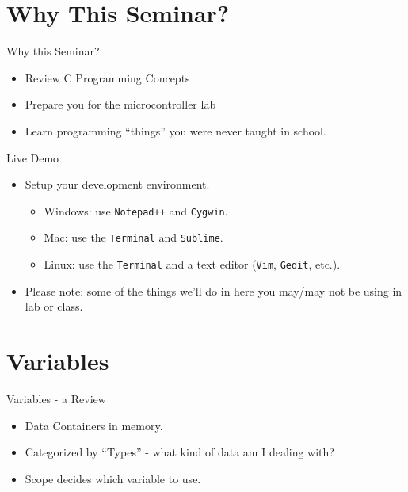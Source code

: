 \documentclass[main.tex]{subfile}
\begin{document}
\section{Why This Seminar?} 
\label{sec:why_this_seminar_}
\begin{frame}{Why this Seminar?}
	\begin{itemize}
		\item Review C Programming Concepts
		\item Prepare you for the microcontroller lab
		\item Learn programming ``things'' you were never taught in school.
	\end{itemize}
\end{frame}

\begin{frame}{Live Demo}
	\begin{itemize}
		\item Setup your development environment.

			\begin{itemize}
				\item Windows: use \texttt{Notepad++} and \texttt{Cygwin}.
				\item Mac: use the \texttt{Terminal} and \texttt{Sublime}.
				\item Linux: use the \texttt{Terminal} and a text editor (\texttt{Vim},
					\texttt{Gedit}, etc.).
			\end{itemize}

		\item Please note: some of the things we'll do in here you may/may not be using in
			lab or class.
	\end{itemize}
\end{frame}


\section{Variables}
\label{sec:variables_scope_and_arrays}
\begin{frame}{Variables - a Review}
	\begin{itemize}
		\item Data Containers in memory.
		\item Categorized by ``Types'' - what kind of data am I dealing with?
		\item Scope decides which variable to use.
	\end{itemize}
\end{frame}
\end{document}
